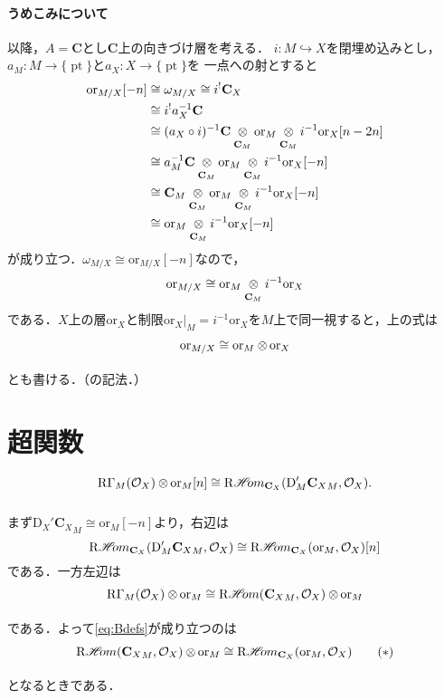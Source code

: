 \documentclass[uplatex,dvipdfmx,a4paper,10pt,draft]{jsarticle}
\makeatletter
\theoremstyle{definition}
\newcommand{\cc}{\mathbf{C}}
\newcommand{\mcal}{\mathcal}
\renewenvironment{proof}[1][\proofname]{\par
  \pushQED{\qed}%
  \normalfont \topsep6\p@\@plus6\p@\relax
  \trivlist
  \item[\hskip\labelsep
         \bfseries
    {#1}]\ignorespaces
}{%
  \popQED\endtrivlist\@endpefalse
}
\renewcommand{\proofname}{証明.}
\numberwithin{equation}{section}
\newcommand{\pt}{\mathop{\mathrm{pt}}\nolimits}
\newcommand{\cO}{\mcal{O}}
\newcommand{\HOM}{\mathop{\mathscr{H}\hspace{-2pt}om}\nolimits}%
\newcommand{\RHOM}{\mathop{\mathrm{R}\hspace{-1.5pt}\HOM}\nolimits}
\newcommand{\RG}{\mathop{\mathrm{R}\hspace{-0pt}\Gamma}\nolimits}
\newcommand{\rmD}{\mathrm{D}}
\newcommand{\ori}{\mathord{\mathrm{or}}}
\newcommand{\tens}[1][]{\mathbin{\otimes_{\raise1.5ex\hbox to-.1em{}{#1}}}}
\newcommand{\ttens}[1][]{\mathbin{\mathop{\overset{\mathrm{}}{\tens}}_{#1}}}
\newcommand{\mres}[2][]{{\left.{#1}\right\rvert}_{#2}}
\theoremstyle{mystyle}
\makeatother
\begin{document}
\paragraph{うめこみについて}
以降，\(A=\cc\)とし\(\cc\)上の向きづけ層を考える．
\(i\colon M\hookrightarrow X\)を閉埋め込みとし，
\(a_M\colon M\to\{\pt\}\)と\(a_X\colon X\to\{\pt\}\)を
一点への射とすると
\begin{align*}
    \ori_{M/X}[-n]
    &\cong \omega_{M/X} \cong i^{!}\cc_X\\
    &\cong i^{!}a_{X}^{-1}\cc\\
    &\cong (a_{X}\circ i)^{-1}\cc\ttens[\cc_M]\ori_{M}\ttens[\cc_M]i^{-1}\ori_{X}[n-2n]\\
    &\cong a_{M}^{-1}\cc\ttens[\cc_M]\ori_{M}\ttens[\cc_M]i^{-1}\ori_{X}[-n]\\
    &\cong \cc_{M}\ttens[\cc_M]\ori_{M}\ttens[\cc_M]i^{-1}\ori_{X}[-n]\\
    &\cong \ori_{M}\ttens[\cc_M]i^{-1}\ori_{X}[-n]
\end{align*}
が成り立つ．\(\omega_{M/X}\cong\ori_{M/X}[-n]\)なので，
\begin{equation}\label{eq:rel-ori1}
    \ori_{M/X}\cong \ori_{M}\ttens[\cc_M]i^{-1}\ori_{X}    
\end{equation}
である．\(X\)上の層\(\ori_X\)と制限\(
    \mres[\ori_{X}]{M}=i^{-1}\ori_{X}
\)を\(M\)上で同一視すると，上の式は
\begin{equation}\label{eq:rel-ori2}
    \ori_{M/X}\cong \ori_{M}\ttens \ori_{X}    
\end{equation}
とも書ける．（\cite[p.130]{KS90}の記法．）

\section{超関数}
\begin{equation}\label{eq:Bdefs}
    \RG_{M}(\cO_X)\ttens[]\ori_{M}[n]
    \cong 
    \RHOM_{\cc_X}(\rmD'_{M}{\cc_X}_M,\cO_X).
\end{equation}
\begin{proof}
    まず\(\rmD_{X}'{\cc_X}_{M}\cong\ori_{M}[-n]\)より，右辺は\[
        \RHOM_{\cc_X}(\rmD'_{M}{\cc_X}_M,\cO_X)
        \cong
        \RHOM_{\cc_X}(\ori_{M},\cO_X)[n]
    \]
    である．一方左辺は
    \[
        \RG_{M}(\cO_X)\ttens[]\ori_{M}
        \cong
        \RHOM({\cc_{X}}_{M},\cO_X)\ttens[]\ori_{M}
    \]である．よって\eqref{eq:Bdefs}が成り立つのは\[
        \RHOM({\cc_{X}}_{M},\cO_X)\ttens[]\ori_{M}
        \cong 
        \RHOM_{\cc_X}(\ori_{M},\cO_X)\tag{\(\ast\)}\label{eq:goal}
    \]となるときである．
\end{proof}
\end{document}
